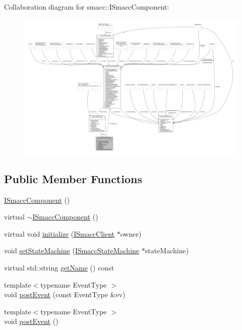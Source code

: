 Collaboration diagram for smacc\+:\+:I\+Smacc\+Component\+:
\nopagebreak
\begin{figure}[H]
\begin{center}
\leavevmode
\includegraphics[width=350pt]{classsmacc_1_1ISmaccComponent__coll__graph}
\end{center}
\end{figure}
\subsection*{Public Member Functions}
\begin{DoxyCompactItemize}
\item 
\hyperlink{classsmacc_1_1ISmaccComponent_a43952d7269ddb81d017a80f018fe502e}{I\+Smacc\+Component} ()
\item 
virtual \hyperlink{classsmacc_1_1ISmaccComponent_a46f5cfc6a308de938b6ee3a5e80a8fe9}{$\sim$\+I\+Smacc\+Component} ()
\item 
virtual void \hyperlink{classsmacc_1_1ISmaccComponent_a3378552cb1a86aa26a07c0edc057448b}{initialize} (\hyperlink{classsmacc_1_1ISmaccClient}{I\+Smacc\+Client} $\ast$owner)
\item 
void \hyperlink{classsmacc_1_1ISmaccComponent_afe57665a6982475e8f9c2a5885e986e1}{set\+State\+Machine} (\hyperlink{classsmacc_1_1ISmaccStateMachine}{I\+Smacc\+State\+Machine} $\ast$state\+Machine)
\item 
virtual std\+::string \hyperlink{classsmacc_1_1ISmaccComponent_aa314809a7fd3516461e31cc120d0cfe7}{get\+Name} () const 
\item 
{\footnotesize template$<$typename Event\+Type $>$ }\\void \hyperlink{classsmacc_1_1ISmaccComponent_a687dead5b87a3b9781b9bf6ab0b7afa5}{post\+Event} (const Event\+Type \&ev)
\item 
{\footnotesize template$<$typename Event\+Type $>$ }\\void \hyperlink{classsmacc_1_1ISmaccComponent_a84455564c2c4b90be58e900050232722}{post\+Event} ()
\end{DoxyCompactItemize}
